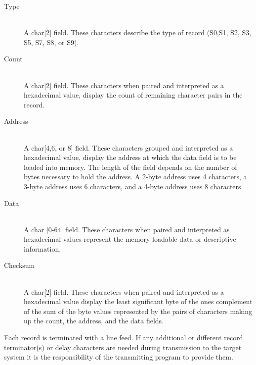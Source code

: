     \begin{description}
        \item[Type]~\\
            A char[2] field. These characters describe the type of record (S0,S1, S2, S3, S5, S7, S8, or S9).

        \item[Count]~\\
            A char[2] field. These characters when paired and interpreted as a hexadecimal value, display the count of remaining character pairs in the record.

        \item[Address]~\\
            A char[4,6, or 8] field. These characters grouped and interpreted as a hexadecimal value, display the address at which the data field is to be loaded into memory. The length of the field depends on the number of bytes necessary to hold the address. A 2-byte address uses 4 characters, a 3-byte address uses 6 characters, and a 4-byte address uses 8 characters.

        \item[Data]~\\
            A char [0-64] field. These characters when paired and interpreted as hexadecimal values represent the memory loadable data or descriptive information.

        \item[Checksum]~\\
            A char[2] field. These characters when paired and interpreted as a hexadecimal value display the least significant byte of the ones complement of the sum of the byte values represented by the pairs of characters making up the count, the address, and the data fields.
    \end{description}

    Each record is terminated with a line feed. If any additional or different record terminator(s) or delay characters are needed during transmission to the target system it is the responsibility of the transmitting program to provide them.

